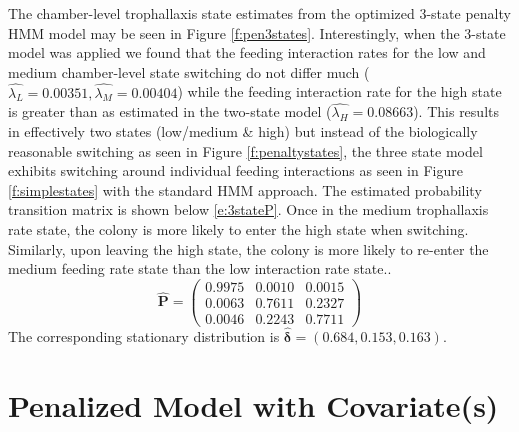 \documentclass[cmbright,fleqn,referee]{envauth}
\begin{document}
The chamber-level trophallaxis state estimates from the optimized 3-state penalty HMM model may be seen in Figure \ref{f:pen3states}. Interestingly, when the 3-state model was applied we found that the feeding interaction rates for the low and medium chamber-level state switching do not differ much ($\hat{\lambda_L} = 0.00351, \hat{\lambda_M} = 0.00404$)  while the feeding interaction rate for the high state is greater than as estimated in the two-state model ($\hat{\lambda_H} = 0.08663$). This results in effectively two states (low/medium \& high) but instead of the biologically reasonable switching as seen in Figure \ref{f:penaltystates}, the three state model exhibits switching around individual feeding interactions as seen in Figure \ref{f:simplestates} with the standard HMM approach. 
The estimated probability transition matrix is shown below \eqref{e:3stateP}. Once in the medium trophallaxis rate state, the colony is more likely to enter the high state when switching. Similarly, upon leaving the high state, the colony is more likely to re-enter the medium feeding rate state than the low interaction rate state..
\begin{equation}
\hat{\mathbf{P}} = \begin{pmatrix}
 0.9975 & 0.0010 & 0.0015 \\
 0.0063 & 0.7611 & 0.2327 \\
 0.0046 & 0.2243 & 0.7711
\end{pmatrix}
\label{e:3stateP}
\end{equation}
The corresponding stationary distribution is $\bm{\hat{\delta}} = (0.684, 0.153, 0.163)$.
% 
\section{Penalized Model with Covariate(s)}
\label{s:covariate}
\end{document}
